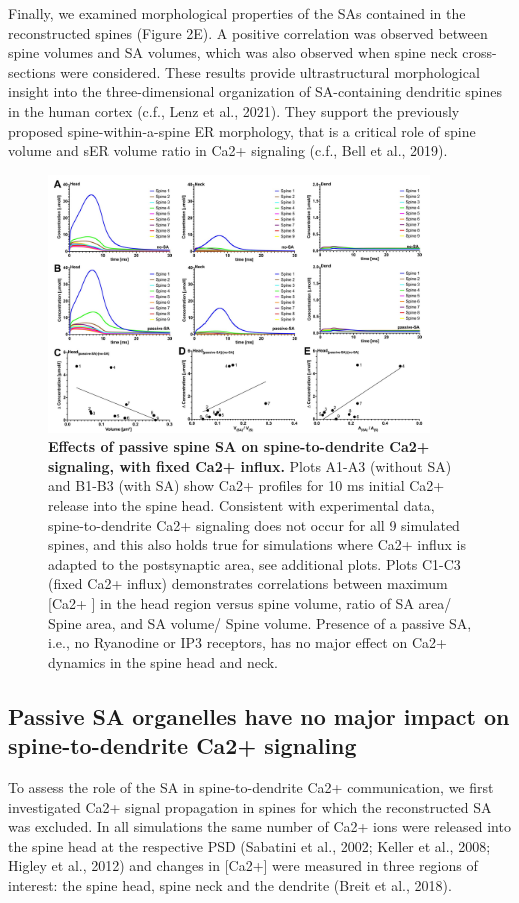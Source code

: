 \documentclass[fleqn,12pt]{wlscirep}
\begin{document}
Finally, we examined morphological properties of the SAs contained in the reconstructed spines (Figure 2E). A positive correlation was observed between spine volumes and SA volumes, which was also observed when spine neck cross-sections were considered. These results provide ultrastructural morphological insight into the three-dimensional organization of SA-containing dendritic spines in the human cortex (c.f., Lenz et al., 2021). They support the previously proposed spine-within-a-spine ER morphology, that is a critical role of spine volume and sER volume ratio in Ca2+ signaling (c.f., Bell et al., 2019). 

\begin{figure}[h!]
\centering
\includegraphics[width=0.9\textwidth]{images/figure3.jpg}
\caption{{\small\textbf{ Effects of passive spine SA on spine-to-dendrite Ca2+ signaling, with fixed Ca2+ influx.}  Plots A1-A3 (without  SA) and B1-B3 (with SA) show Ca2+ profiles for 10 ms initial Ca2+ release into the spine head.  Consistent with experimental data, spine-to-dendrite Ca2+ signaling does not occur for all 9 simulated spines, and this also holds true for simulations where Ca2+ influx is adapted to the postsynaptic area, see additional plots. Plots C1-C3 (fixed Ca2+ influx) demonstrates correlations between maximum [Ca2+ ] in the head region versus spine volume, ratio of SA area/ Spine area, and SA volume/ Spine volume. Presence of a passive SA, i.e., no Ryanodine or IP3 receptors, has no major effect on Ca2+ dynamics in the spine head and neck.}}
\end{figure}

\subsection*{Passive SA organelles have no major impact on spine-to-dendrite Ca2+ signaling} To assess the role of the SA in spine-to-dendrite Ca2+ communication, we first investigated Ca2+ signal propagation in spines for which the reconstructed SA was excluded. In all simulations the same number of Ca2+ ions were released into the spine head at the respective PSD (Sabatini et al., 2002; Keller et al., 2008; Higley et al., 2012) and changes in [Ca2+] were measured in three regions of interest: the spine head, spine neck and the dendrite (Breit et al., 2018).
\end{document}
